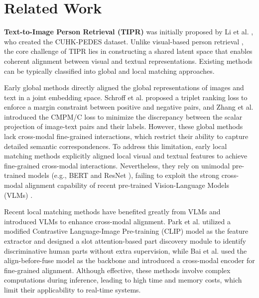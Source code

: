 \documentclass[acmsmall]{acmart}
\begin{document}
\section{Related Work}

{\bfseries Text-to-Image Person Retrieval (TIPR)} was initially
proposed by Li et al. \cite{li2017person}, who created the
CUHK-PEDES dataset. Unlike visual-based person retrieval
\cite{cheng2022hybrid, cheng2025semantic, he2025exploring,
yang2025feature}, the core challenge of TIPR lies in constructing a
shared latent space that enables coherent alignment between visual
and textual representations. Existing methods can be typically
classified into global and local matching approaches.

Early global methods \cite{zheng2020dual, zhu2021dssl} directly
aligned the global representations of images and text in a joint
embedding space. Schroff et al. \cite{schroff2015facenet} proposed a
triplet ranking loss to enforce a margin constraint between positive
and negative pairs, and Zhang et al. \cite{zhang2018deep} introduced
the CMPM/C loss to minimize the discrepancy between the scalar
projection of image-text pairs and their labels. However, these
global methods lack cross-modal fine-grained interactions, which
restrict their ability to capture detailed semantic correspondences.
To address this limitation, early local matching methods
\cite{wang2020vitaa, gao2021contextual, shao2022learning} explicitly
aligned local visual and textual features to achieve fine-grained
cross-modal interactions. Nevertheless, they rely on unimodal
pre-trained models (e.g., BERT \cite{devlin2019bert} and ResNet
\cite{he2016deep}), failing to exploit the strong cross-modal
alignment capability of recent pre-trained Vision-Language Models
(VLMs) \cite{li22blip, yan2023clip, li2021align}.

Recent local matching methods \cite{ergasti2025mars, lu2025prompt,
qin2024noisy, wu2024text, huang2025cross} have benefited greatly
from VLMs and introduced VLMs to enhance cross-modal alignment. Park
et al. \cite{park2024plot} utilized a modified Contrastive
Language-Image Pre-training (CLIP) \cite{radford2021learning} model
as the feature extractor and designed a slot attention-based
\cite{locatello2020object} part discovery module to identify
discriminative human parts without extra supervision, while Bai et
al. \cite{bai2023rasa} used the align-before-fuse model
\cite{li2021align} as the backbone and introduced a cross-modal
encoder for fine-grained alignment. Although effective, these
methods involve complex computations during inference, leading to
high time and memory costs, which limit their applicability to
real-time systems.
\end{document}
